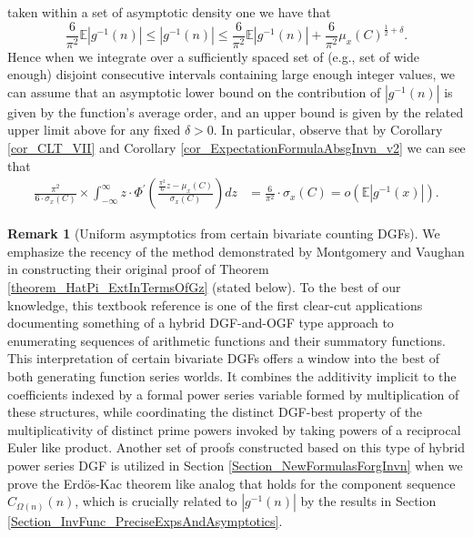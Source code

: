 \documentclass[11pt,reqno,a4letter]{article}
\numberwithin{figure}{section}
\numberwithin{table}{section}
\theoremstyle{plain}
\numberwithin{theorem}{section}
\theoremstyle{definition}
\newtheorem{remark}[theorem]{Remark}
\begin{document}
taken within a set of asymptotic density one we have that 
\begin{equation*} 
\frac{6}{\pi^2}\mathbb{E}|g^{-1}(n)| \leq |g^{-1}(n)| \leq \frac{6}{\pi^2}\mathbb{E}|g^{-1}(n)| + \frac{6}{\pi^2} 
     \mu_x(C)^{\frac{1}{2} + \delta}. 
\end{equation*} 
Hence when we integrate over a sufficiently spaced set of (e.g., set of wide enough) 
disjoint consecutive intervals 
containing large enough integer values, 
we can assume that an asymptotic lower bound on the 
contribution of $|g^{-1}(n)|$ is given by the function's average 
order, and an upper bound is given by the related 
upper limit above for any fixed $\delta > 0$. 
In particular, observe that by 
Corollary \ref{cor_CLT_VII} and 
Corollary \ref{cor_ExpectationFormulaAbsgInvn_v2} 
we can see that 
\begin{align*} 
\frac{\pi^2}{6 \cdot \sigma_x(C)} \times \int_{-\infty}^{\infty} z \cdot 
     \Phi^{\prime}\left(\frac{\frac{\pi^2}{6} z - \mu_x(C)}{\sigma_x(C)}\right) dz & = 
     \frac{6}{\pi^2} \cdot \sigma_x(C) = o\left(\mathbb{E}|g^{-1}(x)|\right). 
\end{align*} 

\begin{remark}[Uniform asymptotics from certain bivariate counting DGFs] 
\label{remark_MV_NewDGFApplications} 
We emphasize the recency of the method demonstrated by 
Montgomery and Vaughan in constructing their original proof of 
Theorem \ref{theorem_HatPi_ExtInTermsOfGz} (stated below). 
To the best of our knowledge, this textbook reference is 
one of the first clear-cut applications documenting something of a hybrid 
DGF-and-OGF type approach to enumerating sequences of arithmetic functions 
and their summatory functions. 
This interpretation of certain bivariate DGFs 
offers a window into the best of both generating function series worlds. 
It combines the additivity 
implicit to the coefficients indexed by a formal power series variable formed by 
multiplication of these structures, while coordinating the distinct DGF-best 
property of the multiplicativity of distinct prime powers invoked 
by taking powers of a reciprocal Euler like product. 
Another set of proofs constructed based on this type of hybrid power series 
DGF is utilized in Section \ref{Section_NewFormulasForgInvn} 
when we prove the Erd\"os-Kac theorem like analog 
that holds for the component sequence $C_{\Omega(n)}(n)$, which is 
crucially related to $|g^{-1}(n)|$ by the 
results in Section \ref{Section_InvFunc_PreciseExpsAndAsymptotics}. 
\end{remark} 
\end{document}
